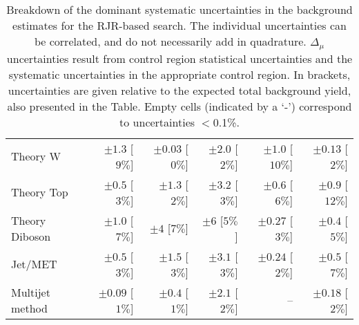 \begin{table}[tbp]
\begin{center}
\begin{tabular}{|lrrrrr|}
Theory W                          & $\pm 1.3$ [$9\%$]   & $\pm 0.03$ [$0\%$] & $\pm 2.0$ [$2\%$]  & $\pm 1.0$ [$10\%$]  & $\pm 0.13$ [$2\%$]  \\
Theory Top                        & $\pm 0.5$ [$3\%$]   & $\pm 1.3$ [$2\%$]  & $\pm 3.2$ [$3\%$]  & $\pm 0.6$ [$6\%$]   & $\pm 0.9$ [$12\%$]  \\
Theory Diboson                    & $\pm 1.0$ [$7\%$]   & $\pm 4$ [$7\%$]    & $\pm 6$ [$5\%$]    & $\pm 0.27$ [$3\%$]  & $\pm 0.4$ [$5\%$]   \\
Jet/MET                           & $\pm 0.5$ [$3\%$]   & $\pm 1.5$ [$3\%$]  & $\pm 3.1$ [$3\%$]  & $\pm 0.24$ [$2\%$]  & $\pm 0.5$ [$7\%$]   \\
Multijet method                   & $\pm 0.09$ [$1\%$]  & $\pm 0.4$ [$1\%$]  & $\pm 2.1$ [$2\%$]  & --                  & $\pm 0.18$ [$2\%$]  \\
\hline
\end{tabular}

\end{center}
\caption[Breakdown of uncertainty on background estimates]{
Breakdown of the dominant systematic uncertainties in the background estimates for the RJR-based search.
The individual uncertainties can be correlated, and do not necessarily add in quadrature.
$\Delta_{\mu}$ uncertainties result from control region statistical uncertainties and the systematic uncertainties in the appropriate control region.
In brackets, uncertainties are given relative to the expected total background yield, also presented in the Table. Empty cells (indicated by a `-') correspond to uncertainties $<$0.1\%. \label{tab:BreakdownSysSRCompressed_RJR}}
\end{table}
